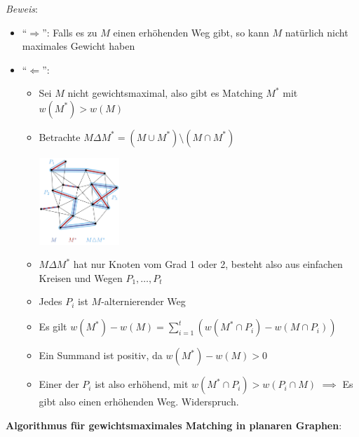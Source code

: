\textit{Beweis}: 
\begin{itemize}
	\item \enquote{$\Rightarrow$}: Falls es zu $M$ einen erhöhenden Weg gibt, so kann $M$ natürlich nicht maximales Gewicht haben
	\item \enquote{$\Leftarrow$}: 
	\begin{itemize}
		\item Sei $M$ nicht gewichtsmaximal, also gibt es Matching $M^*$ mit $w(M^*)>w(M)$
		\item Betrachte $M\Delta M^*=(M\cup M^*)\setminus(M\cap M^*)$
		\begin{center}
			\includegraphics[width=0.25\textwidth]{images/moag1.png}
		\end{center}
		\item $M\Delta M^*$ hat nur Knoten vom Grad 1 oder 2, besteht also aus einfachen Kreisen und Wegen $P_1,\ldots, P_t$
		\item Jedes $P_i$ ist $M$-alternierender Weg
		\item Es gilt $w(M^*)-w(M)=\sum\limits_{i=1}^t (w(M^*\cap P_i)-w(M\cap P_i))$
		\item Ein Summand ist positiv, da $w(M^*)-w(M)>0$
		\item Einer der $P_i$ ist also erhöhend, mit $w(M^*\cap P_i)>w(P_i\cap M)$ $\implies$ Es gibt also einen erhöhenden Weg. Widerspruch.
	\end{itemize}
\end{itemize}
\bigskip
\textbf{Algorithmus für gewichtsmaximales Matching in planaren Graphen}: 
